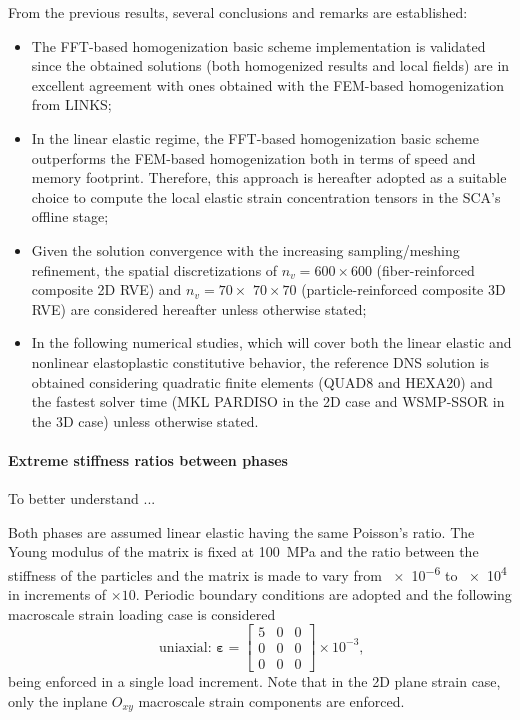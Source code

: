 From the previous results, several conclusions and remarks are established:
\begin{itemize}
  \item The FFT-based homogenization basic scheme implementation is validated since the obtained solutions (both homogenized results and local fields) are in excellent agreement with ones obtained with the FEM-based homogenization from LINKS;
  \item In the linear elastic regime, the FFT-based homogenization basic scheme outperforms the FEM-based homogenization both in terms of speed and memory footprint. Therefore, this approach is hereafter adopted as a suitable choice to compute the local elastic strain concentration tensors in the SCA's offline stage;
  \item Given the solution convergence with the increasing sampling/meshing refinement, the spatial discretizations of \(n_{v}=600 \times 600\) (fiber-reinforced composite 2D RVE) and \(n_{v}=70 \times\) \(70 \times 70\) (particle-reinforced composite 3D RVE) are considered hereafter unless otherwise stated;
  \item In the following numerical studies, which will cover both the linear elastic and nonlinear elastoplastic constitutive behavior, the reference DNS solution is obtained considering quadratic finite elements (QUAD8 and HEXA20) and the fastest solver time (MKL PARDISO in the 2D case and WSMP-SSOR in the \(3 \mathrm{D}\) case) unless otherwise stated.
\end{itemize}


\paragraph{Extreme stiffness ratios between phases}

To better understand ...

Both phases are assumed linear elastic having the same Poisson's ratio.
The Young modulus of the matrix is fixed at \SI{100}{\mega\pascal} and the ratio between the stiffness of the particles and the matrix is made to vary from \num{e-6} to \num{e4} in increments of \(\times 10\).
Periodic boundary conditions are adopted and the following macroscale strain loading case is considered
\begin{equation}
\text { uniaxial: } \bm{\varepsilon}=\left[\begin{array}{lll}
5 & 0 & 0 \\
0 & 0 & 0 \\
0 & 0 & 0
\end{array}\right] \times 10^{-3},
\end{equation}
being enforced in a single load increment.
Note that in the 2D plane strain case, only the inplane \(O_{x y}\) macroscale strain components are enforced.

